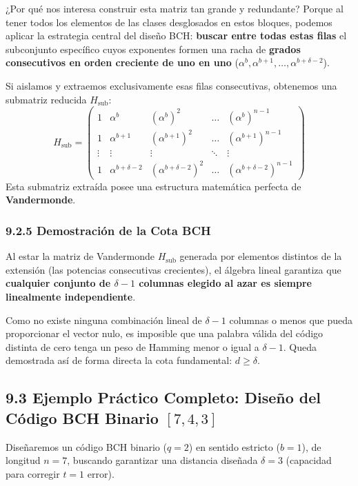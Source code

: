 \documentclass{article}
\begin{document}
¿Por qué nos interesa construir esta matriz tan grande y redundante? Porque al tener todos los elementos de las clases desglosados en estos bloques, podemos aplicar la estrategia central del diseño BCH: \textbf{buscar entre todas estas filas} el subconjunto específico cuyos exponentes formen una racha de \textbf{grados consecutivos en orden creciente de uno en uno} ($\alpha^b, \alpha^{b+1}, \dots, \alpha^{b+\delta-2}$).

Si aislamos y extraemos exclusivamente esas filas consecutivas, obtenemos una submatriz reducida $H_{\text{sub}}$:
\[
H_{\text{sub}} = \begin{pmatrix}
1 & \alpha^b & (\alpha^b)^2 & \dots & (\alpha^b)^{n-1} \\
1 & \alpha^{b+1} & (\alpha^{b+1})^2 & \dots & (\alpha^{b+1})^{n-1} \\
\vdots & \vdots & \vdots & \ddots & \vdots \\
1 & \alpha^{b+\delta-2} & (\alpha^{b+\delta-2})^2 & \dots & (\alpha^{b+\delta-2})^{n-1}
\end{pmatrix}
\]
Esta submatriz extraída posee una estructura matemática perfecta de \textbf{Vandermonde}.

\subsubsection{9.2.5 Demostración de la Cota BCH}
Al estar la matriz de Vandermonde $H_{\text{sub}}$ generada por elementos distintos de la extensión (las potencias consecutivas crecientes), el álgebra lineal garantiza que \textbf{cualquier conjunto de $\delta-1$ columnas elegido al azar es siempre linealmente independiente}. 

Como no existe ninguna combinación lineal de $\delta-1$ columnas o menos que pueda proporcionar el vector nulo, es imposible que una palabra válida del código distinta de cero tenga un peso de Hamming menor o igual a $\delta-1$. Queda demostrada así de forma directa la cota fundamental: $d \ge \delta$.

\newpage
\subsection{9.3 Ejemplo Práctico Completo: Diseño del Código BCH Binario \texorpdfstring{$[7, 4, 3]$}{[7, 4, 3]}}

Diseñaremos un código BCH binario ($q=2$) en sentido estricto ($b=1$), de longitud $n=7$, buscando garantizar una distancia diseñada $\delta = 3$ (capacidad para corregir $t = 1$ error).
\end{document}
